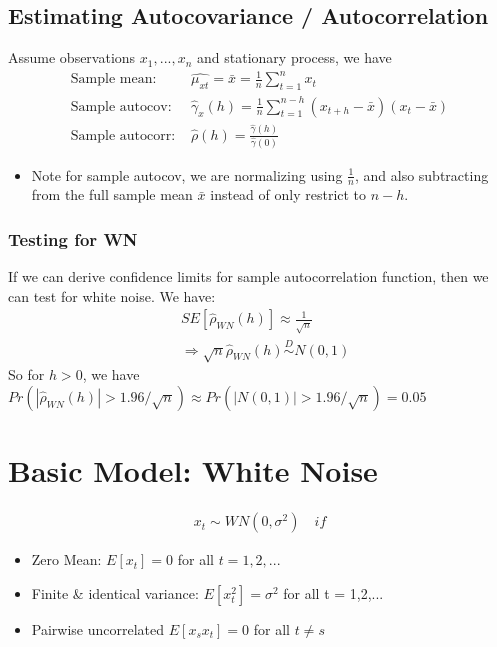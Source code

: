 \subsection{Estimating Autocovariance / Autocorrelation}
Assume observations $x_1, ..., x_n$ and stationary process, we have 
    \begin{align*}
        \textrm{Sample mean: }& \hat{\mu_{xt}}=\bar{x} = \frac{1}{n}\sum_{t=1}^{n}x_t\\
        \textrm{Sample autocov: }& \hat{\gamma}_x(h) = \frac{1}{n}\sum_{t=1}^{n-h}(x_{t+h} - \bar{x})(x_t - \bar{x}) \\
        \textrm{Sample autocorr: } & \hat{\rho}(h) = \frac{\hat{\gamma}(h)}{\hat{\gamma}(0)}
    \end{align*}
    \begin{itemize}
        \item Note for sample autocov, we are normalizing using $\frac{1}{n}$, and also subtracting from the full sample mean $\bar{x}$ instead of only restrict to $n-h$. 
    \end{itemize}
\subsubsection{Testing for WN}
If we can derive confidence limits for sample autocorrelation function, then we can test for white noise. We have: 
    \begin{align*}
        & SE[\hat{\rho}_{WN}(h)] \approx \frac{1}{\sqrt{n}} \\
        & \Longrightarrow \sqrt{n} \hat{\rho}_{WN}(h) \overset{D}{\sim} N(0,1)
    \end{align*}
So for $h>0$, we have $Pr(|\hat{\rho}_{WN}(h)| > 1.96 / \sqrt{n}) \approx Pr(|N(0,1)| > 1.96 / \sqrt{n})=0.05$



\section{Basic Model: White Noise} 
\begin{align*}
x_t \sim WN(0, \sigma^2) \quad if 
\end{align*}
\begin{itemize}
    \item Zero Mean: $E[x_t]=0$ for all $t=1,2,...$
    \item Finite \& identical variance: $E[x_t^2]=\sigma^2$ for all t = 1,2,...
    \item Pairwise uncorrelated $E[x_sx_t]=0$ for all $t \neq s$
\end{itemize}

